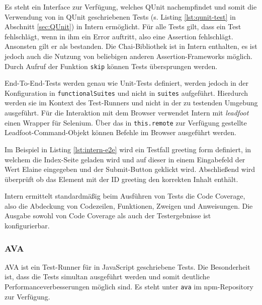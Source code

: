 \begin{figure}[H]
	
\end{figure}

Es steht ein Interface zur Verfügung, welches QUnit nachempfindet und somit die Verwendung von in QUnit geschriebenen Tests (s. Listing \ref{lst:qunit-test} in Abschnitt \ref{sec:QUnit}) in Intern ermöglicht. Für alle Tests gilt, dass ein Test fehlschlägt, wenn in ihm ein Error auftritt, also eine Assertion fehlschlägt. Ansonsten gilt er als bestanden. Die Chai-Bibliothek ist in Intern enthalten, es ist jedoch auch die Nutzung von beliebigen anderen Assertion-Frameworks möglich. Durch Aufruf der Funktion \texttt{skip} können Tests übersprungen werden.\cite{intern-userguide}

End-To-End-Tests werden genau wie Unit-Tests definiert, werden jedoch in der Konfiguration in \texttt{functionalSuites} und nicht in \texttt{suites} aufgeführt. Hierdurch werden sie im Kontext des Test-Runners und nicht in der zu testenden Umgebung ausgeführt. Für die Interaktion mit dem Browser verwendet Intern mit \textit{leadfoot} einen Wrapper für Selenium. Über das in \texttt{this.remote} zur Verfügung gestellte Leadfoot-Command-Objekt können Befehle im Browser ausgeführt werden.\cite{intern-userguide}

\begin{figure}[H]
	
\end{figure}

Im Beispiel in Listing \ref{lst:intern-e2e} wird ein Testfall \glqq greeting form\grqq{} definiert, in welchem die Index-Seite geladen wird und auf dieser in einem Eingabefeld der Wert \glqq Elaine\grqq{} eingegeben und der Submit-Button geklickt wird. Abschließend wird überprüft ob das Element mit der ID \glqq greeting\grqq{} den korrekten Inhalt enthält.

Intern ermittelt standardmäßig beim Ausführen von Tests die Code Coverage, also die Abdeckung von Codezeilen, Funktionen, Zweigen und Anweisungen. Die Ausgabe sowohl von Code Coverage als auch der Testergebnisse ist konfigurierbar.\cite{intern-userguide}

\subsubsection{AVA}
\label{sec:Ava}
AVA ist ein Test-Runner für in JavaScript geschriebene Tests. Die Besonderheit ist, dass die Tests simultan ausgeführt werden und somit deutliche Performanceverbesserungen möglich sind. Es steht unter \texttt{ava} im npm-Repository zur Verfügung.\cite{ava}

